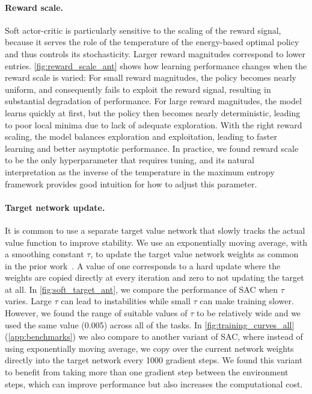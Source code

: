 \documentclass{article}
\begin{document}
\vspace{-0.1in}
\paragraph{Reward scale.} Soft actor-critic is particularly sensitive to the scaling of the reward signal, because it serves the role of the temperature of the energy-based optimal policy and thus controls its stochasticity. Larger reward magnitudes correspond to lower entries. \autoref{fig:reward_scale_ant} shows how learning performance changes when the reward scale is varied: For small reward magnitudes, the policy becomes nearly uniform, and consequently fails to exploit the reward signal, resulting in substantial degradation of performance. For large reward magnitudes, the model learns quickly at first, but the policy then becomes nearly deterministic, leading to poor local minima due to lack of adequate exploration. With the right reward scaling, the model balances exploration and exploitation, leading to faster learning and better asymptotic performance. In practice, we found reward scale to be the only hyperparameter that requires tuning, and its natural interpretation as the inverse of the temperature in the maximum entropy framework provides good intuition for how to adjust this parameter.


\vspace{-0.1in}
\paragraph{Target network update.} It is common to use a separate target value network that slowly tracks the actual value function to improve stability. We use an exponentially moving average, with a smoothing constant $\tau$, to update the target value network weights as common in the prior work~\cite{lillicrap2015continuous,mnih2015human}. A value of one corresponds to a hard update where the weights are copied directly at every iteration and zero to not updating the target at all. In \autoref{fig:soft_target_ant}, we compare the performance of SAC when $\tau$ varies. Large $\tau$ can lead to instabilities while small $\tau$ can make training slower. However, we found the range of suitable values of $\tau$ to be relatively wide and we used the same value (0.005) across all of the tasks. In \autoref{fig:training_curves_all} (\autoref{app:benchmarks}) we also compare to another variant of SAC, where instead of using exponentially moving average, we copy over the current network weights directly into the target network every 1000 gradient steps. We found this variant to benefit from taking more than one gradient step between the environment steps, which can improve performance but also increases the computational cost.
\end{document}
